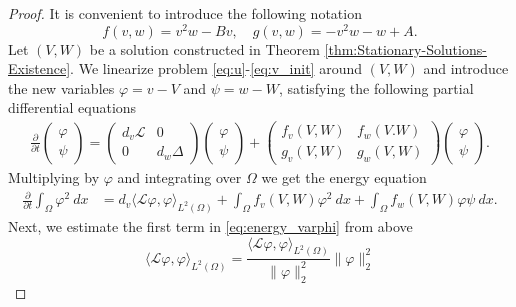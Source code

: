 \documentclass[11pt, a4paper]{article}
\theoremstyle{break}
\theoremstyle{break}
\theoremstyle{break}
\theoremstyle{break}
\theoremstyle{break}
\theoremstyle{break}
\theoremstyle{break}
\begin{document}
\begin{proof}
    It is convenient to introduce the following notation
    \begin{equation}
        \label{eq:non_linearities}
        f(v, w) = v^2w - Bv, \quad g(v,w) = -v^2w - w + A.
    \end{equation}
    Let $(V, W)$ be a solution constructed in Theorem \ref{thm:Stationary-Solutions-Existence}. We linearize problem \eqref{eq:u}-\eqref{eq:v_init} around $(V, W)$ and introduce the new variables $\varphi = v - V$ and $\psi = w - W$, satisfying the following partial differential equations
    \begin{align*}
        \frac{\partial}{\partial t}
        \begin{pmatrix}
            \varphi \\ \psi
        \end{pmatrix}
        =
        \begin{pmatrix}
            d_v \mathcal{L} & 0 \\ 0 & d_w \Delta
        \end{pmatrix}
        \begin{pmatrix}
            \varphi \\ \psi
        \end{pmatrix}
        +
        \begin{pmatrix}
            f_v(V,W) & f_w(V. W) \\ g_v(V,W) & g_w(V,W)
        \end{pmatrix}
        \begin{pmatrix}
            \varphi \\ \psi
        \end{pmatrix}.
    \end{align*}
    Multiplying by $\varphi$ and integrating over $\Omega$ we get the energy equation
    \begin{align}
        \label{eq:energy_varphi}
        \frac{\partial}{\partial t} \int_\Omega \varphi^2\:dx 
        &=
        d_v \langle \mathcal{L}\varphi, \varphi \rangle_{L^2(\Omega)} +  \int_\Omega f_v(V, W) \varphi^2 \:dx + \int_\Omega f_w(V, W) \varphi \psi \:dx.
    \end{align}
    Next, we estimate the first term in \eqref{eq:energy_varphi} from above
    \begin{equation}
        \label{eq:energy_varphi_1st_term}
        \langle \mathcal{L}\varphi, \varphi \rangle_{L^2(\Omega)} 
        =
        \frac{\langle \mathcal{L}\varphi, \varphi \rangle_{L^2(\Omega)}}{\|\varphi\|_2^2}\|\varphi\|_2^2

\end{equation}
\end{proof}
\end{document}
